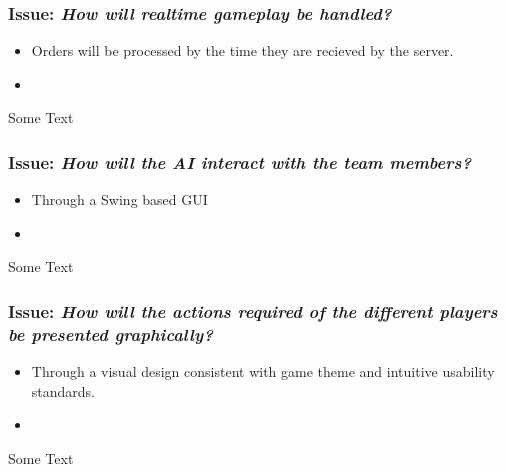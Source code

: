 \subsubsection*{Issue: \textit{How will realtime gameplay be handled?}}

  \begin{itemize}
    \item Orders will be processed by the time they are recieved by the server.
    \item 
  \end{itemize}

Some Text

\subsubsection*{Issue: \textit{How will the AI interact with the team members?}}

  \begin{itemize}
    \item Through a Swing based GUI
    \item 
  \end{itemize}

Some Text

\subsubsection*{Issue: \textit{How will the actions required of the different players be presented graphically?}}

  \begin{itemize}
    \item Through a visual design consistent with game theme and intuitive usability standards.
    \item 
  \end{itemize}

Some Text
